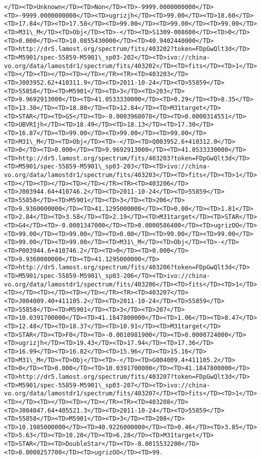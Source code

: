\documentclass[11pt]{article}
\begin{document}
\begin{Verbatim}[commandchars=\\\{\}]
</TD><TD>Unknown</TD><TD>Non</TD><TD>-9999.0000000000</TD><TD>-9999.0000000000</TD><TD>ugrizjh</TD><TD>99.00</TD><TD>18.60</TD><TD>17.84</TD><TD>17.58</TD><TD>99.00</TD><TD>99.00</TD><TD>99.00</TD><TD>M31\_M</TD><TD>Obj</TD><TD>-</TD><TD>S1309-008600</TD><TD>0</TD><TD>0.000</TD><TD>10.0855430000</TD><TD>40.9402440000</TD><TD>http://dr5.lamost.org/spectrum/fits/403202?token=FDpGwQlt3d</TD><TD>M5901/spec-55859-M5901\_sp03-202</TD><TD>ivo://china-vo.org/data/lamostdr1/spectrum/fits/403202</TD><TD>fits</TD><TD>1</TD><TD></TD><TD></TD><TD></TD></TR><TR><TD>403203</TD><TD>J003952.62+410311.9</TD><TD>2011-10-24</TD><TD>55859</TD><TD>55858</TD><TD>M5901</TD><TD>3</TD><TD>203</TD><TD>9.9692913000</TD><TD>41.0533330000</TD><TD>0.29</TD><TD>8.35</TD><TD>13.30</TD><TD>18.80</TD><TD>12.84</TD><TD>M31target</TD><TD>STAR</TD><TD>G5</TD><TD>-0.0003968078</TD><TD>0.0000314551</TD><TD>UBVRIjh</TD><TD>18.49</TD><TD>18.13</TD><TD>17.30</TD><TD>16.87</TD><TD>99.00</TD><TD>99.00</TD><TD>99.00</TD><TD>M31\_M</TD><TD>Obj</TD><TD>-</TD><TD>Q003952.6+410312.0</TD><TD>0</TD><TD>0.000</TD><TD>9.9692913000</TD><TD>41.0533330000</TD><TD>http://dr5.lamost.org/spectrum/fits/403203?token=FDpGwQlt3d</TD><TD>M5901/spec-55859-M5901\_sp03-203</TD><TD>ivo://china-vo.org/data/lamostdr1/spectrum/fits/403203</TD><TD>fits</TD><TD>1</TD><TD></TD><TD></TD><TD></TD></TR><TR><TD>403206</TD><TD>J003944.64+410746.2</TD><TD>2011-10-24</TD><TD>55859</TD><TD>55858</TD><TD>M5901</TD><TD>3</TD><TD>206</TD><TD>9.9360000000</TD><TD>41.1295000000</TD><TD>0.00</TD><TD>1.81</TD><TD>2.84</TD><TD>3.58</TD><TD>2.19</TD><TD>M31target</TD><TD>STAR</TD><TD>G4</TD><TD>-0.0001347000</TD><TD>0.0000586400</TD><TD>ugrizOO</TD><TD>99.00</TD><TD>99.00</TD><TD>0.00</TD><TD>99.00</TD><TD>99.00</TD><TD>99.00</TD><TD>99.00</TD><TD>M31\_M</TD><TD>Obj</TD><TD>-</TD><TD>P003944.6+410746.2</TD><TD>0</TD><TD>0.000</TD><TD>9.9360000000</TD><TD>41.1295000000</TD><TD>http://dr5.lamost.org/spectrum/fits/403206?token=FDpGwQlt3d</TD><TD>M5901/spec-55859-M5901\_sp03-206</TD><TD>ivo://china-vo.org/data/lamostdr1/spectrum/fits/403206</TD><TD>fits</TD><TD>1</TD><TD></TD><TD></TD><TD></TD></TR><TR><TD>403207</TD><TD>J004009.40+411105.2</TD><TD>2011-10-24</TD><TD>55859</TD><TD>55858</TD><TD>M5901</TD><TD>3</TD><TD>207</TD><TD>10.0391700000</TD><TD>41.1847800000</TD><TD>1.06</TD><TD>8.47</TD><TD>12.48</TD><TD>18.37</TD><TD>10.91</TD><TD>M31target</TD><TD>STAR</TD><TD>F0</TD><TD>-0.0010981900</TD><TD>0.0000724000</TD><TD>ugrizjh</TD><TD>19.43</TD><TD>17.94</TD><TD>17.36</TD><TD>16.99</TD><TD>16.82</TD><TD>15.96</TD><TD>15.16</TD><TD>M31\_M</TD><TD>Obj</TD><TD>-</TD><TD>G004009.4+411105.2</TD><TD>0</TD><TD>0.000</TD><TD>10.0391700000</TD><TD>41.1847800000</TD><TD>http://dr5.lamost.org/spectrum/fits/403207?token=FDpGwQlt3d</TD><TD>M5901/spec-55859-M5901\_sp03-207</TD><TD>ivo://china-vo.org/data/lamostdr1/spectrum/fits/403207</TD><TD>fits</TD><TD>1</TD><TD></TD><TD></TD><TD></TD></TR><TR><TD>403208</TD><TD>J004047.64+405521.3</TD><TD>2011-10-24</TD><TD>55859</TD><TD>55858</TD><TD>M5901</TD><TD>3</TD><TD>208</TD><TD>10.1985000000</TD><TD>40.9226000000</TD><TD>0.46</TD><TD>3.85</TD><TD>5.63</TD><TD>10.20</TD><TD>6.28</TD><TD>M31target</TD><TD>STAR</TD><TD>DoubleStar</TD><TD>-0.0015532200</TD><TD>0.0000257700</TD><TD>ugrizOO</TD><TD>99.
\end{Verbatim}
\end{document}
